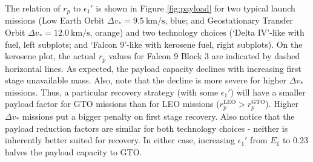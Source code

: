 \documentclass[conf]{new-aiaa}
\begin{document}
The relation of $r_p$ to $\epsilon_1'$ is shown in Figure \ref{fig:payload} for two typical launch missions (Low Earth Orbit $\Delta v_* = \SI{9.5}{\kilo\meter\per\second}$, blue; and Geostationary Transfer Orbit $\Delta v_* = \SI{12.0}{\kilo\meter\per\second}$, orange) and two technology choices (`Delta IV'-like with  fuel, left subplots; and `Falcon 9'-like with kerosene fuel, right subplots). On the kerosene plot, the actual $r_p$ values for Falcon 9 Block 3 \cite{slr:falcon_9} are indicated by dashed horizontal lines. As expected, the payload capacity declines with increasing first stage unavailable mass. Also, note that the decline is more severe for higher $\Delta v_*$ missions. Thus, a particular recovery strategy (with some $\epsilon_1'$) will have a smaller payload factor for GTO missions than for LEO missions ($r_p^{\mathrm{LEO}} > r_p^\mathrm{GTO}$). Higher $\Delta v_*$ missions put a bigger penalty on first stage recovery. Also notice that the payload reduction factors are similar for both technology choices - neither is inherently better suited for recovery. In either case, increasing $\epsilon_1'$ from $E_1$ to 0.23 halves the payload capacity to GTO.
\end{document}
